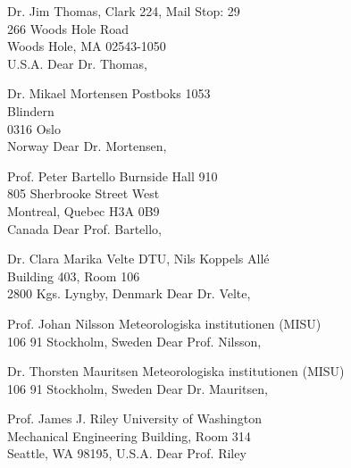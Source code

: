 Dr. Jim Thomas,
Clark 224, Mail Stop: 29\\266 Woods Hole Road\\Woods Hole, MA 02543-1050\\U.S.A.
Dear Dr. Thomas,

Dr. Mikael Mortensen
Postboks 1053\\Blindern\\0316 Oslo\\Norway
Dear Dr. Mortensen,

Prof. Peter Bartello
Burnside Hall 910\\805 Sherbrooke Street West\\Montreal, Quebec H3A 0B9\\Canada
Dear Prof. Bartello,

%

Dr. Clara Marika Velte
DTU, Nils Koppels Allé\\Building 403, Room 106\\2800 Kgs. Lyngby, Denmark
Dear Dr. Velte,

Prof. Johan Nilsson
Meteorologiska institutionen (MISU)\\106 91 Stockholm, Sweden
Dear Prof. Nilsson,

Dr. Thorsten Mauritsen
Meteorologiska institutionen (MISU)\\106 91 Stockholm, Sweden
Dear Dr. Mauritsen,

Prof. James J. Riley
University of Washington\\Mechanical Engineering Building, Room 314\\Seattle, WA 98195, U.S.A.
Dear Prof. Riley



